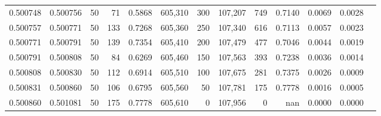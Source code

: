 \begin{tabular}{rrrrrrrrrrrrr}
0.500748 & 0.500756 &    50 &  71 &                                     0.5868 & 605,310 &     300 & 107,207 &     749 & 0.7140 & 0.0069 & 0.0028 \\
0.500757 & 0.500771 &    50 & 133 &                                     0.7268 & 605,360 &     250 & 107,340 &     616 & 0.7113 & 0.0057 & 0.0023 \\
0.500771 & 0.500791 &    50 & 139 &                                     0.7354 & 605,410 &     200 & 107,479 &     477 & 0.7046 & 0.0044 & 0.0019 \\
0.500791 & 0.500808 &    50 &  84 &                                     0.6269 & 605,460 &     150 & 107,563 &     393 & 0.7238 & 0.0036 & 0.0014 \\
0.500808 & 0.500830 &    50 & 112 &                                     0.6914 & 605,510 &     100 & 107,675 &     281 & 0.7375 & 0.0026 & 0.0009 \\
0.500831 & 0.500860 &    50 & 106 &                                     0.6795 & 605,560 &      50 & 107,781 &     175 & 0.7778 & 0.0016 & 0.0005 \\
0.500860 & 0.501081 &    50 & 175 &                                     0.7778 & 605,610 &       0 & 107,956 &       0 &    nan & 0.0000 & 0.0000 \\
\bottomrule
\end{tabular}
